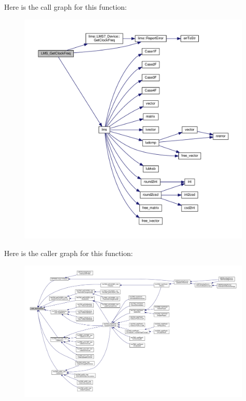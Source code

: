 Here is the call graph for this function\+:
\nopagebreak
\begin{figure}[H]
\begin{center}
\leavevmode
\includegraphics[width=350pt]{df/de1/lms7__api_8cpp_a819ba3d694971caec63c4f4ddcd93669_cgraph}
\end{center}
\end{figure}




Here is the caller graph for this function\+:
\nopagebreak
\begin{figure}[H]
\begin{center}
\leavevmode
\includegraphics[width=350pt]{df/de1/lms7__api_8cpp_a819ba3d694971caec63c4f4ddcd93669_icgraph}
\end{center}
\end{figure}


